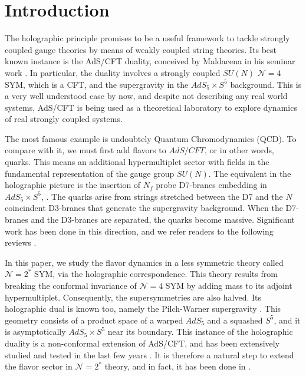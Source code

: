 \section{Introduction}

The holographic principle promises to be a useful framework to tackle strongly coupled gauge theories by means of weakly coupled string theories. Its best known instance is the AdS/CFT duality, conceived by Maldacena in his seminar work \cite{Maldacena:1997re}. In particular, the duality involves a strongly coupled $SU(N)$ $\mathcal{N}=4$ SYM, which is a CFT, and the supergravity in the $AdS_5 \times S^5$ background. This is a very well understood case by now, and despite not describing any real world systems, AdS/CFT is being used as a theoretical laboratory to explore dynamics of real strongly coupled systems.

The most famous example is undoubtely Quantum Chromodynamics (QCD). To compare with it, we must first add flavors to $AdS/CFT$, or in other words, quarks. This means an additional hypermultiplet sector with fields in the fundamental representation of the gauge group $SU(N)$. The equivalent in the holographic picture is the insertion of $N_f$ probe D7-branes embedding in $AdS_5 \times S^5$, \cite{Karch:2002sh}. The quarks arise from strings stretched between the D7 and the $N$ coincindent D3-branes that generate the supergravity background. When the D7-branes and the D3-branes are separated, the quarks become massive. Significant work has been done in this direction, and we refer readers to the following reviews \cite{CasalderreySolana:2011us, Erdmenger:2007cm}.

In this paper, we study the flavor dynamics in a less symmetric theory called $\mathcal{N}=2^*$ SYM, via the holographic correspondence. This theory results from breaking the conformal invariance of $\mathcal{N}=4$ SYM by adding mass to its adjoint hypermultiplet. Consequently, the supersymmetries are also halved. Its holographic dual is known too, namely the Pilch-Warner supergravity \cite{Pilch:2000ue, Pilch:2003jg}. This geometry consists of a product space of a warped $AdS_5$ and a squashed $S^5$, and it is asymptotically $AdS_5 \times S^5$ near its boundary. This instance of the holographic duality is a non-conformal extension of AdS/CFT, and has been extensively studied and tested in the last few years \cite{Buchel:2013id, Chen-Lin:2015xlh, Chen-Lin:2017pay, Russo:2019lgq}. It is therefore a natural step to extend the flavor sector in $\mathcal{N}=2^*$ theory, and in fact, it has been done in \cite{Albash:2011nw}. 

